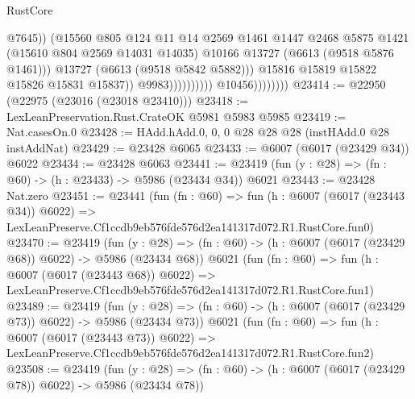 \begin{lexlean}{RustCore}
\begin{coremodule}
                                                  @7645))
                                              (@15560
                                                @805
                                                @124
                                                @11
                                                @14
                                                @2569
                                                @1461
                                                @1447
                                                @2468
                                                @5875
                                                @1421
                                                (@15610 @804 @2569 @14031 @14035)
                                                @10166
                                                @13727
                                                (@6613 (@9518 @5876 @1461)))
                                              @13727
                                              (@6613 (@9518 @5842 @5882)))
                                            @15816
                                            @15819
                                            @15822
                                            @15826
                                            @15831
                                            @15837))
                                        @9983))))))))))
                    @10456))))))))
@23414 := @22950 (@22975 (@23016 (@23018 @23410)))
@23418 := LexLeanPreservation.Rust.CrateOK @5981 @5983 @5985
@23419 := Nat.casesOn.{0}
@23428 := HAdd.hAdd.{0, 0, 0} @28 @28 @28 (instHAdd.{0} @28 instAddNat)
@23429 := @23428 @6065
@23433 := @6007 (@6017 (@23429 @34)) @6022
@23434 := @23428 @6063
@23441 := @23419 (fun (y : @28) => (fn : @60) -> (h : @23433) -> @5986 (@23434 @34)) @6021
@23443 := @23428 Nat.zero
@23451 := @23441
    (fun (fn : @60) =>
    fun (h : @6007 (@6017 (@23443 @34)) @6022) =>
    LexLeanPreserve.Cf1ccdb9eb576fde576d2ea141317d072.R1.RustCore.fun0)
@23470 := @23419
    (fun (y : @28) => (fn : @60) -> (h : @6007 (@6017 (@23429 @68)) @6022) -> @5986 (@23434 @68))
    @6021
    (fun (fn : @60) =>
    fun (h : @6007 (@6017 (@23443 @68)) @6022) =>
    LexLeanPreserve.Cf1ccdb9eb576fde576d2ea141317d072.R1.RustCore.fun1)
@23489 := @23419
    (fun (y : @28) => (fn : @60) -> (h : @6007 (@6017 (@23429 @73)) @6022) -> @5986 (@23434 @73))
    @6021
    (fun (fn : @60) =>
    fun (h : @6007 (@6017 (@23443 @73)) @6022) =>
    LexLeanPreserve.Cf1ccdb9eb576fde576d2ea141317d072.R1.RustCore.fun2)
@23508 := @23419
    (fun (y : @28) => (fn : @60) -> (h : @6007 (@6017 (@23429 @78)) @6022) -> @5986 (@23434 @78))

\end{coremodule}
\end{lexlean}
